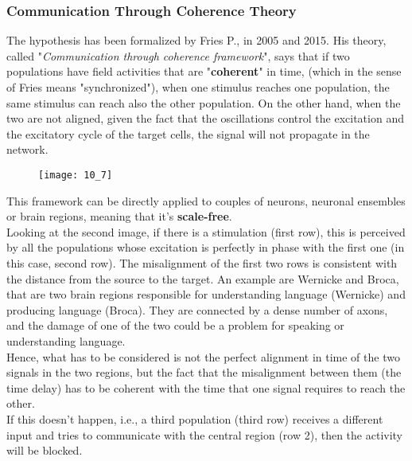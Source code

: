 \subsubsection{Communication Through Coherence Theory}
The hypothesis has been formalized by Fries P., in 2005 and 2015. His theory, called "\textit{Communication through coherence framework}", says that if two populations 
have field activities that are "\textbf{coherent}" in time, (which in the sense of Fries means "synchronized"), when one stimulus reaches one population, the same stimulus 
can reach also the other population. On the other hand, when the two are not aligned, given the fact that the oscillations control the excitation and the excitatory cycle 
of the target cells, the signal will not propagate in the network.
\begin{figure}[H]
    \texttt{[image: 10\_7]}
    \centering
\end{figure}
This framework can be directly applied to couples of neurons, neuronal ensembles or brain regions, meaning that 
it's \textbf{scale-free}.\\
Looking at the second image, if there is a stimulation (first row), this is perceived by all the populations whose 
excitation is perfectly in phase with the first one (in this case, second row). The misalignment of the first two rows 
is consistent with the distance from the source to the target. An example are Wernicke and Broca, that are two brain 
regions responsible for understanding language (Wernicke) and producing language (Broca). They are connected by a dense number of axons, and the damage of one of the two could be a problem for speaking or understanding language.\\ 
Hence, what has to be considered is not the perfect alignment in time of the two signals in the two regions, but the fact that the misalignment between them (the time delay) has to be coherent with the time that one signal requires to reach the other.\\
If this doesn't happen, i.e., a third population (third row) receives a different input and tries to communicate with the central region (row 2), then the activity will be blocked.

